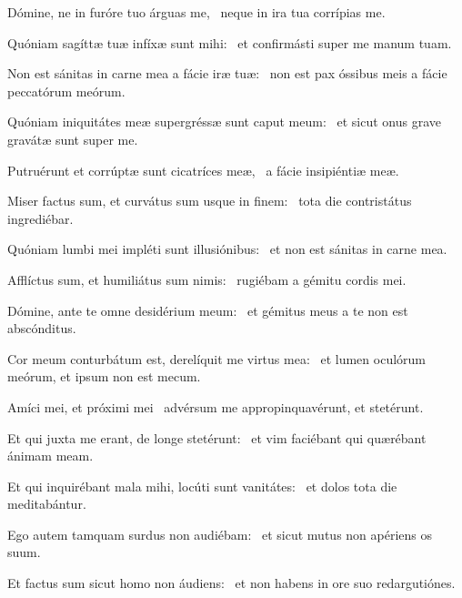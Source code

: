 \item Dómine, ne in furóre tuo árguas me,~\psstar{} neque in ira tua corrípias me.

\item Quóniam sagíttæ tuæ infíxæ sunt mihi:~\psstar{} et confirmásti super me manum tuam.

\item Non est sánitas in carne mea a fácie iræ tuæ:~\psstar{} non est pax óssibus meis a fácie peccatórum meórum.

\item Quóniam iniquitátes meæ supergréssæ sunt caput meum:~\psstar{} et sicut onus grave gravátæ sunt super me.

\item Putruérunt et corrúptæ sunt cicatríces meæ,~\psstar{} a fácie insipiéntiæ meæ.

\item Miser factus sum, et curvátus sum usque in finem:~\psstar{} tota die contristátus ingrediébar.

\item Quóniam lumbi mei impléti sunt illusiónibus:~\psstar{} et non est sánitas in carne mea.

\item Afflíctus sum, et humiliátus sum nimis:~\psstar{} rugiébam a gémitu cordis mei.

\item Dómine, ante te omne desidérium meum:~\psstar{} et gémitus meus a te non est abscónditus.

\item Cor meum conturbátum est, derelíquit me virtus mea:~\psstar{} et lumen oculórum meórum, et ipsum non est mecum.

\item Amíci mei, et próximi mei~\psstar{} advérsum me appropinquavérunt, et stetérunt.

\item Et qui juxta me erant, de longe stetérunt:~\psstar{} et vim faciébant qui quærébant ánimam meam.

\item Et qui inquirébant mala mihi, locúti sunt vanitátes:~\psstar{} et dolos tota die meditabántur.

\item Ego autem tamquam surdus non audiébam:~\psstar{} et sicut mutus non apériens os suum.

\item Et factus sum sicut homo non áudiens:~\psstar{} et non habens in ore suo redargutiónes.

